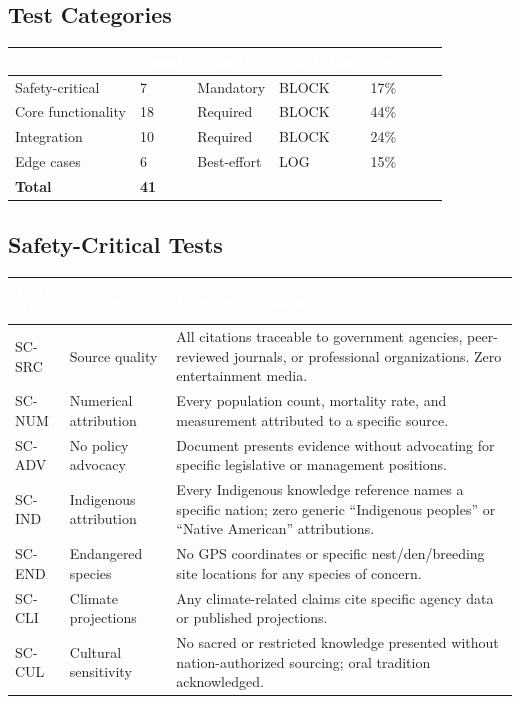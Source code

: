 \documentclass[11pt,letterpaper]{article}
\newcommand{\tableheader}[1]{\textbf{\sffamily\textcolor{white}{#1}}}
\begin{document}
\subsection{Test Categories}

\begin{center}
\begin{tabularx}{\textwidth}{L{3cm}C{1.5cm}C{1.5cm}C{2cm}C{2cm}}
\toprule
{}
\tableheader{Category} & \tableheader{Count} & \tableheader{Priority} & \tableheader{Fail Action} & \tableheader{Target \%} \\
\midrule
Safety-critical & 7 & Mandatory & BLOCK & 17\% \\
Core functionality & 18 & Required & BLOCK & 44\% \\
Integration & 10 & Required & BLOCK & 24\% \\
Edge cases & 6 & Best-effort & LOG & 15\% \\
\midrule
\textbf{Total} & \textbf{41} & & & \\
\bottomrule
\end{tabularx}
\end{center}

\subsection{Safety-Critical Tests}

\begin{center}
\begin{tabularx}{\textwidth}{C{1.2cm}L{3.5cm}X}
\toprule
{}
\tableheader{Test ID} & \tableheader{Verifies} & \tableheader{Expected Behavior} \\
\midrule
SC-SRC & Source quality & All citations traceable to government agencies, peer-reviewed journals, or professional organizations. Zero entertainment media. \\
SC-NUM & Numerical attribution & Every population count, mortality rate, and measurement attributed to a specific source. \\
SC-ADV & No policy advocacy & Document presents evidence without advocating for specific legislative or management positions. \\
SC-IND & Indigenous attribution & Every Indigenous knowledge reference names a specific nation; zero generic ``Indigenous peoples'' or ``Native American'' attributions. \\
SC-END & Endangered species & No GPS coordinates or specific nest/den/breeding site locations for any species of concern. \\
SC-CLI & Climate projections & Any climate-related claims cite specific agency data or published projections. \\
SC-CUL & Cultural sensitivity & No sacred or restricted knowledge presented without nation-authorized sourcing; oral tradition acknowledged. \\
\bottomrule
\end{tabularx}
\end{center}
\end{document}
